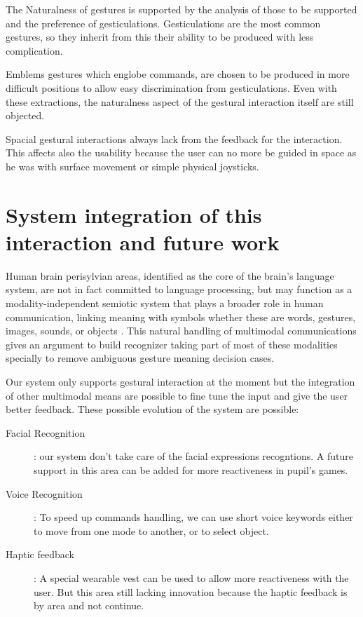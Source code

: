 \documentclass{llncs}
\begin{document}
The Naturalness of gestures is supported by the analysis of those to be
supported and the preference of gesticulations.
Gesticulations are the most common gestures, so they inherit from this their
ability to be produced with less complication.

Emblems gestures which englobe commands, are chosen to be produced in more
difficult positions to allow easy discrimination from gesticulations.
Even with these extractions, the naturalness aspect of the gestural interaction
itself are still objected.  \cite{naturalNorman2010}

Spacial gestural interactions always lack from the feedback for the interaction.
This affects also the usability because the user can no more be guided in space
as he was with surface movement or simple physical joysticks.

\section{System integration of this interaction and future work}
Human brain perisylvian areas, identified as the core of the brain's language
system, are not in fact committed to language processing, but may function as a
modality-independent semiotic system that plays a broader role in human
communication, linking meaning with symbols whether these are words, gestures,
images, sounds, or objects \cite{SymbolicGest}.
This natural handling of multimodal communications gives an argument to build
recognizer taking part of most of these modalities specially to remove ambiguous
gesture meaning decision cases.

Our system only supports gestural interaction at the moment but the integration
of other multimodal means are possible to fine tune the input and give the user
better feedback.
These possible evolution of the system are possible:

\begin{description}
 \item[Facial Recognition]: our system don't take care of the facial expressions
recogntions. A future support in this area can be added for more reactiveness in
pupil's games.
 \item[Voice Recognition]: To speed up commands handling, we can use short voice
keywords either to move from one mode to another, or to select object.
 \item[Haptic feedback]: A special wearable vest can be used to allow more
reactiveness with the user. But this area still lacking innovation because the
haptic feedback is by area and not continue.
\end{description}
\end{document}
